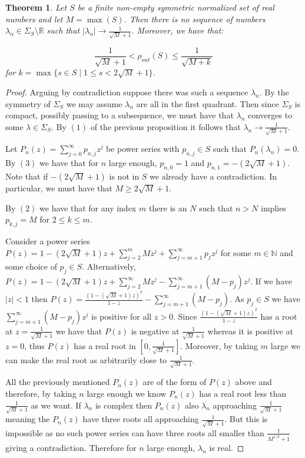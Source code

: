 \documentclass[11pt]{amsart}
\newtheorem{theorem}{Theorem}
\numberwithin{theorem}{section} %
\numberwithin{corollary}{section}
\numberwithin{lemma}{section}
\numberwithin{proposition}{section}
\numberwithin{definition}{section}
\begin{document}
\begin{theorem}
\label{rho-out}
Let $S$ be a finite non-empty symmetric normalized set of real numbers and let $M = \max(S)$. Then there is no sequence of numbers $\lambda_n \in \Sigma_S \setminus \mathbb{R}$ such that $|\lambda_n| \rightarrow \frac{1}{\sqrt{M}+1}$. Moreover, we have that:

$$\frac{1}{\sqrt{M}+1} < \rho_{out}(S) \leqslant \frac{1}{\sqrt{M+k}} $$
for $k = \max \{ s \in S \mid 1 \leqslant s < 2\sqrt{M} + 1 \}$.
\end{theorem}

\begin{proof}
Arguing by contradiction suppose there was such a sequence $\lambda_n$. By the symmetry of $\Sigma_S$ we may assume $\lambda_n$ are all in the first quadrant. Then since $\Sigma_S$ is compact, possibly passing to a subsequence, we must have that $\lambda_n$ converges to some $\lambda \in \Sigma_S$. By $(1)$ of the previous proposition it follows that $\lambda_n \rightarrow \frac{1}{\sqrt{M}+1}$. 

Let $P_n(z) = \sum_{j=0}^\infty p_{n, j} z^j$ be power series with $p_{n, j} \in S$ such that $P_n(\lambda_n) = 0$. By $(3)$ we have that for $n$ large enough, $p_{n, 0} = 1$ and $p_{n, 1} = -(2\sqrt{M}+1)$. Note that if $-(2\sqrt{M}+1)$ is not in $S$ we already have a contradiction. In particular, we must have that $M \geqslant 2\sqrt{M}+1$.

By $(2)$ we have that for any index $m$ there is an $N$ such that $n > N$ implies $p_{k, j} = M$ for $2 \leqslant k \leqslant m$. 

Consider a power series $P(z) = 1 - (2\sqrt{M}+1)z + \sum_{j=2}^m Mz^j + \sum_{j=m+1}^\infty p_jz^j$ for some $m \in \mathbb{N}$ and some choice of $p_j \in S$. Alternatively, $P(z) = 1 - (2\sqrt{M}+1)z + \sum_{j=2}^\infty Mz^j - \sum_{j=m+1}^\infty (M-p_j)z^j$. If we have $|z| < 1$ then $P(z) = \frac{(1-(\sqrt{M}+1)z)^2}{1-z} - \sum_{j=m+1}^\infty (M-p_j)$. As $p_j \in S$ we have $\sum_{j=m+1}^\infty (M-p_j)z^j$ is positive for all $z > 0$.  Since $\frac{(1-(\sqrt{M}+1)z)^2}{1-z}$ has a root at $z = \frac{1}{\sqrt{M}+1}$ we have that $P(z)$ is negative at $\frac{1}{\sqrt{M}+1}$ whereas it is positive at $z=0$, thus $P(z)$ has a real root in $[0, \frac{1}{\sqrt{M}+1}]$. Moreover, by taking $m$ large we can make the real root as arbitrarily close to $\frac{1}{\sqrt{M}+1}$.

All the previously mentioned $P_n(z)$ are of the form of $P(z)$ above and therefore, by taking $n$ large enough we know $P_n(z)$ has a real root less than $\frac{1}{\sqrt{M}+1}$ as we want. If $\lambda_n$ is complex then $P_n(z)$ also $\overline{\lambda_n}$ approaching $\frac{1}{\sqrt{M}+1}$ meaning the $P_n(z)$ have three roots all approaching $\frac{1}{\sqrt{M}+1}$. But this is impossible as no such power series can have three roots all smaller than $\frac{1}{M^{1/3}+1}$ giving a contradiction. Therefore for $n$ large enough, $\lambda_n$ is real.


\end{proof}
\end{document}
